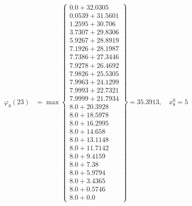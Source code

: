 \documentclass{article}
\begin{document}
\begin{align*}
  
  
  
\varphi_{8}(23) &= \max \left\{ \begin{array}{c}
0.0 + 32.0305 \\
 0.0539 + 31.5601 \\
 1.2595 + 30.706 \\
 3.7307 + 29.8306 \\
 5.9267 + 28.8919 \\
 7.1926 + 28.1987 \\
 7.7386 + 27.3446 \\
 7.9278 + 26.4692 \\
 7.9826 + 25.5305 \\
 7.9963 + 24.1299 \\
 7.9993 + 22.7321 \\
 7.9999 + 21.7934 \\
 8.0 + 20.3928 \\
 8.0 + 18.5978 \\
 8.0 + 16.2995 \\
 8.0 + 14.658 \\
 8.0 + 13.1148 \\
 8.0 + 11.7142 \\
 8.0 + 9.4159 \\
 8.0 + 7.38 \\
 8.0 + 5.9794 \\
 8.0 + 3.4365 \\
 8.0 + 0.5746 \\
 8.0 + 0.0
\end{array} \right\}=35.3913,\quad x_{8}^0=5\\
  
  
  

\end{align*}
\end{document}
